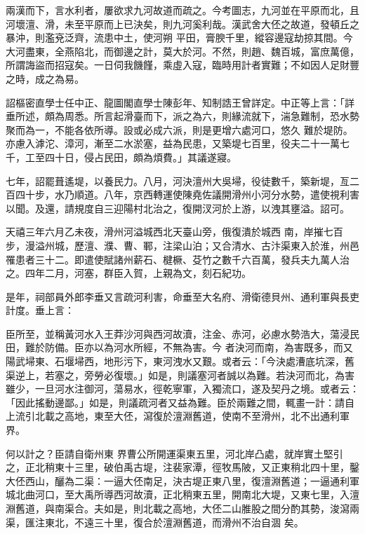 \begin{pinyinscope}
 兩漢而下，言水利者，屢欲求九河故道而疏之。今考圖志，九河並在平原而北，且河壞澶、滑，未至平原而上已決矣，則九河奚利哉。漢武舍大伾之故道，發頓丘之暴沖，則濫兗泛齊，流患中土，使河朔
 平田，膏腴千里，縱容邊寇劫掠其間。今大河盡東，全燕陷北，而御邊之計，莫大於河。不然，則趙、魏百城，富庶萬億，所謂誨盜而招寇矣。一日伺我饑饉，乘虛入寇，臨時用計者實難；不如因人足財豐之時，成之為易。



 詔樞密直學士任中正、龍圖閣直學士陳彭年、知制誥王曾詳定。中正等上言：「詳垂所述，頗為周悉。所言起滑臺而下，派之為六，則緣流就下，湍急難制，恐水勢聚而為一，不能各依所導。設或必成六派，則是更增六處河口，悠久
 難於堤防。亦慮入滹沱、漳河，漸至二水淤塞，益為民患，又築堤七百里，役夫二十一萬七千，工至四十日，侵占民田，頗為煩費。」其議遂寢。



 七年，詔罷葺遙堤，以養民力。八月，河決澶州大吳埽，役徒數千，築新堤，亙二百四十步，水乃順道。八年，京西轉運使陳堯佐議開滑州小河分水勢，遣使視利害以聞。及還，請規度自三迎陽村北治之，復開汊河於上游，以洩其壅溢。詔可。



 天禧三年六月乙未夜，滑州河溢城西北天臺山旁，俄復潰於城西
 南，岸摧七百步，漫溢州城，歷澶、濮、曹、鄆，注梁山泊；又合清水、古汴渠東入於淮，州邑罹患者三十二。即遣使賦諸州薪石、楗橛、芟竹之數千六百萬，發兵夫九萬人治之。四年二月，河塞，群臣入賀，上親為文，刻石紀功。



 是年，祠部員外郎李垂又言疏河利害，命垂至大名府、滑衛德貝州、通利軍與長吏計度。垂上言：



 臣所至，並稱黃河水入王莽沙河與西河故瀆，注金、赤河，必慮水勢浩大，蕩浸民田，難於防備。臣亦以為河水所經，不無為害。今
 者決河而南，為害既多，而又陽武埽東、石堰埽西，地形污下，東河洩水又艱。或者云：「今決處漕底坑深，舊渠逆上，若塞之，旁勞必復壞。」如是，則議塞河者誠以為難。若決河而北，為害雖少，一旦河水注御河，蕩易水，徑乾寧軍，入獨流口，遂及契丹之境。或者云：「因此搖動邊鄙。」如是，則議疏河者又益為難。臣於兩難之間，輒畫一計：請自上流引北載之高地，東至大伾，瀉復於澶淵舊道，使南不至滑州，北不出通利軍界。



 何以計之？臣請自衛州東
 界曹公所開運渠東五里，河北岸凸處，就岸實土堅引之，正北稍東十三里，破伯禹古堤，注裴家潭，徑牧馬陂，又正東稍北四十里，鑿大伾西山，釃為二渠：一逼大伾南足，決古堤正東八里，復澶淵舊道；一逼通利軍城北曲河口，至大禹所導西河故瀆，正北稍東五里，開南北大堤，又東七里，入澶淵舊道，與南渠合。夫如是，則北載之高地，大伾二山脽股之間分酌其勢，浚瀉兩渠，匯注東北，不遠三十里，復合於澶淵舊道，而滑州不治自涸
 矣。




\end{pinyinscope}
